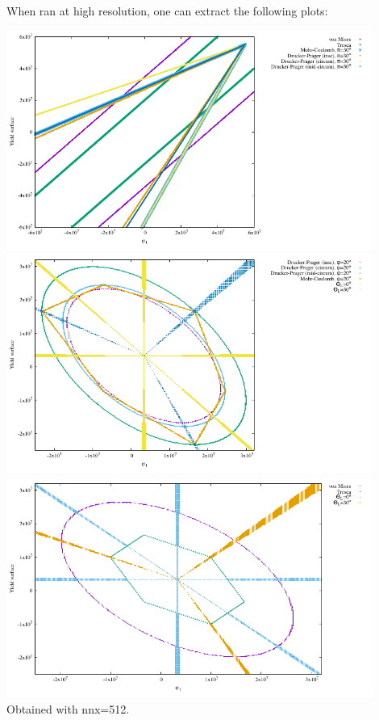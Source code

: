 When ran at high resolution, one can extract the following plots:
\begin{center}
\includegraphics[width=12cm]{python_codes/fieldstone_159/images/surfaces_xy.pdf}
\includegraphics[width=12cm]{python_codes/fieldstone_159/images/surfaces_plane.pdf}
\includegraphics[width=12cm]{python_codes/fieldstone_159/images/surfaces_plane2.pdf}\\
{\captionfont Obtained with nnx=512}.
\end{center}

